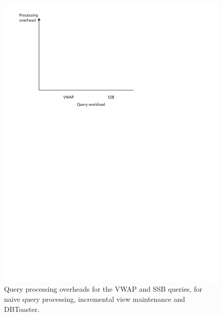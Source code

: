 {\begin{figure}
\includegraphics[scale=0.6]{figures/axes-query.pdf}
\caption{Query processing overheads for the VWAP and SSB queries, for naive
  query processing, incremental view maintenance and DBToaster.}
\label{fig:overhead-vwap-ssb}
\end{figure}
}


